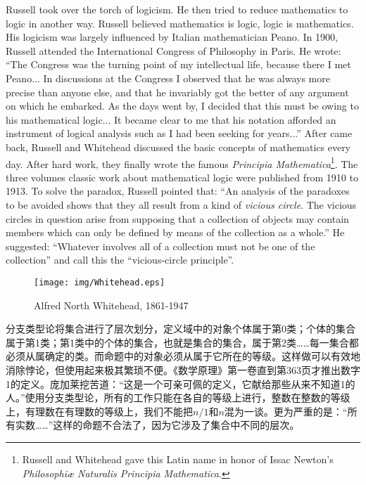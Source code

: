 \documentclass{article}
\begin{document}
Russell took over the torch of logicism. He then tried to reduce mathematics to logic in another way. Russell believed mathematics is logic, logic is mathematics. His logicism was largely influenced by Italian mathematician Peano. In 1900, Russell attended the International Congress of Philosophy in Paris. He wrote: ``The Congress was the turning point of my intellectual life, because there I met Peano... In discussions at the Congress I observed that he was always more precise than anyone else, and that he invariably got the better of any argument on which he embarked. As the days went by, I decided that this must be owing to his mathematical logic... It became clear to me that his notation afforded an instrument of logical analysis such as I had been seeking for years...'' After came back, Russell and Whitehead discussed the basic concepts of mathematics every day. After hard work, they finally wrote the famous {\em Principia Mathematica}\footnote{Russell and Whitehead gave this Latin name in honor of Issac Newton's {\em Philosophiæ Naturalis Principia Mathematica}.}. The three volumes classic work about mathematical logic were published from 1910 to 1913. To solve the paradox, Russell pointed that: ``An analysis of the paradoxes to be avoided shows that they all result from a kind of {\em vicious circle}. The vicious circles in question arise from supposing that a collection of objects may contain members which can only be defined by means of the collection as a whole.'' He suggested: ``Whatever involves all of a collection must not be one of the collection'' and call this the ``vicious-circle principle''.

\begin{wrapfigure}{R}{0.4\textwidth}
 \centering
 \texttt{[image: img/Whitehead.eps]}
 \captionsetup{labelformat=empty}
 \caption{Alfred North Whitehead, 1861-1947}
 \label{fig:Whitehead}
\end{wrapfigure}

分支类型论将集合进行了层次划分，定义域中的对象个体属于第0类；个体的集合属于第1类；第1类中的个体的集合，也就是集合的集合，属于第2类……每一集合都必须从属确定的类。而命题中的对象必须从属于它所在的等级。这样做可以有效地消除悖论，但使用起来极其繁琐不便。《数学原理》第一卷直到第363页才推出数字1的定义。庞加莱挖苦道：“这是一个可亲可佩的定义，它献给那些从来不知道1的人。”使用分支类型论，所有的工作只能在各自的等级上进行，整数在整数的等级上，有理数在有理数的等级上，我们不能把$n/1$和$n$混为一谈。更为严重的是：“所有实数……”这样的命题不合法了，因为它涉及了集合中不同的层次。
\end{document}

